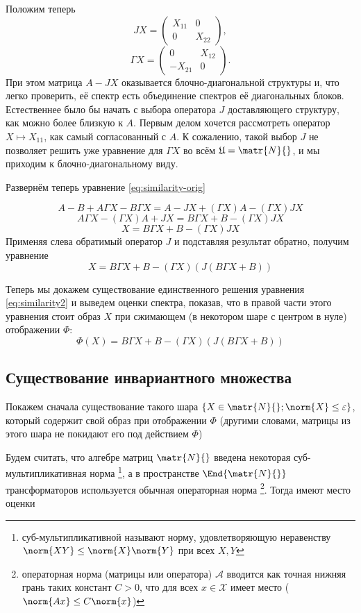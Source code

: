 Положим теперь
\[
    JX = \begin{pmatrix}
        X_{11} & 0 \\
        0      & X_{22}
    \end{pmatrix},
    \]
\[ \Gamma X =
    \begin{pmatrix}
        0       & X_{12} \\
        -X_{21} & 0
    \end{pmatrix}.
    \]
При этом матрица \( A - JX \) оказывается блочно-диагональной структуры
и, что легко проверить, её спектр есть объединение спектров её диагональных блоков.
Естественнее было бы начать с выбора оператора \( J \) доставляющего структуру,
как можно более близкую к \( A \).
Первым делом хочется рассмотреть оператор \( X\mapsto X_{11} \),
как самый согласованный с \( A \).
К сожалению, такой выбор \( J \) не позволяет решить уже уравнение для \(\Gamma X\) во всём \(\mathfrak U = \matr{N}{}\),
и мы приходим к блочно-диагональному виду.

Развернём теперь уравнение \eqref{eq:similarity-orig}

\[
    A - B + A\Gamma X - B\Gamma X = A - JX + (\Gamma X) A - (\Gamma X) JX
    \]
\[
    A\Gamma X - (\Gamma X) A + JX = B \Gamma X + B - (\Gamma X) JX
    \]
\[
    X = B \Gamma X + B - (\Gamma X) JX
    \]
Применяя слева обратимый оператор \( J \) и подставляя результат обратно, получим уравнение
\begin{equation}\label{eq:similarity2}
    X = B \Gamma X + B - (\Gamma X) (J(B\Gamma X + B))
\end{equation}

Теперь мы докажем существование единственного решения уравнения \eqref{eq:similarity2}
и выведем оценки спектра,
показав, что в правой части этого уравнения стоит образ \( X \)
при сжимающем (в некотором шаре с центром в нуле) отображении \( \Phi \):
\[ \Phi(X) = B \Gamma X + B - (\Gamma X) (J(B\Gamma X + B)) \]

\subsection{Существование инвариантного множества}
Покажем сначала существование такого шара \( \{ X\in\matr{N}{}; \norm{X} \leq \varepsilon \} \),
который содержит свой образ при отображении \( \Phi \)
(другими словами, матрицы из этого шара
 не покидают его под действием \( \Phi \))

Будем считать, что алгебре матриц \( \matr{N}{} \)
введена некоторая суб-мультипликативная норма
\footnote{суб-мультипликативной называют норму, удовлетворяющую неравенству \( \norm{XY}\leq \norm{X}\norm{Y} \) при всех \( X, Y \) },
а в пространстве \( \End{\matr{N}{}} \) трансформаторов
используется обычная операторная норма%
\footnote{операторная норма
(матрицы или оператора) \( \mathcal A \)
вводится как точная нижняя грань таких констант \( C > 0 \),
что для всех \( x\in\mathscr X\) имеет место
(\( \norm{A x} \leq C \norm{x} \))}.
Тогда имеют место оценки


